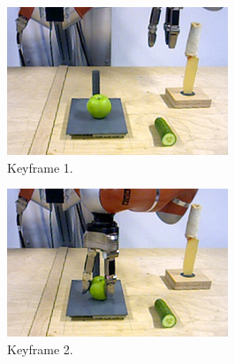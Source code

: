 \begin{figure}
  \centering
  \begin{subfigure}[t]{0.475\textwidth}
    \includegraphics[width=\textwidth]{./figures/sec/planning/exec4/frame0390.jpg}
    \caption{Keyframe 1.}
    \label{fig:sec_usingaffordanceforplanning_results_scenario4_1}
  \end{subfigure}
  \hfill
  \begin{subfigure}[t]{0.475\textwidth}
    \includegraphics[width=\textwidth]{./figures/sec/planning/exec4/frame0822.jpg}
    \caption{Keyframe 2.}
    \label{fig:sec_usingaffordanceforplanning_results_scenario4_2}
  \end{subfigure}\\%
  \begin{subfigure}[t]{0.475\textwidth}

\end{subfigure}
\end{figure}
